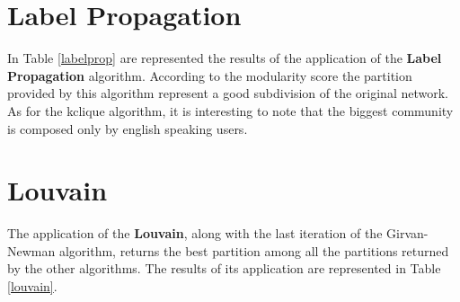 
\section{Label Propagation} %
\label{sec:label_propagation}
    In Table \ref{labelprop} are represented the results of the application of the \textbf{Label Propagation}
    algorithm. According to the modularity score the partition provided by this algorithm represent a good
    subdivision of the original network. As for the kclique algorithm, it is interesting to note that the biggest
    community is composed only by english speaking users.

    \begin{table}[H]
        \centering
        \begin{subtable}{\textwidth}
        \end{subtable}
        \caption{Evaluation of the partition obtained by the application of the Label Propagaion algorithm.}
        \label{labelprop}
    \end{table}


\section{Louvain} %
\label{sec:louvain}
    The application of the \textbf{Louvain}, along with the last iteration of the Girvan-Newman algorithm,
    returns the best partition among all the partitions returned by the other algorithms. The results of its
    application are represented in Table \ref{louvain}.


